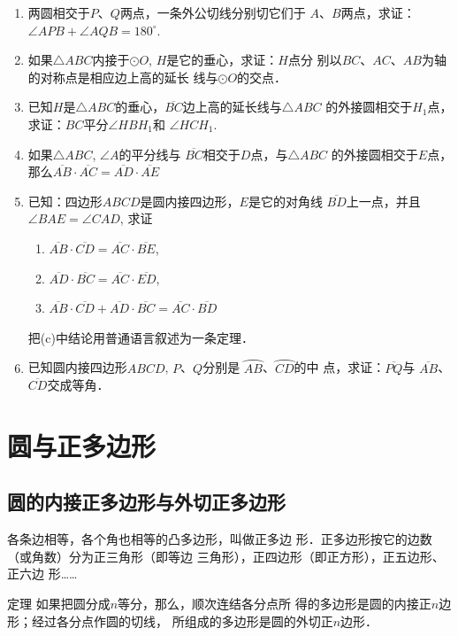 \begin{enumerate}
  \item 两圆相交于$P$、$Q$两点，一条外公切线分别切它们于
  $A$、$B$两点，求证：$\angle APB+\angle AQB=180^{\circ}$.
  \item 如果$\triangle ABC$内接于$\odot O$, $H$是它的垂心，求证：$H$点分
  别以$BC$、$AC$、$AB$为轴的对称点是相应边上高的延长
  线与$\odot O$的交点．
  \item 已知$H$是$\triangle ABC$的垂心，$\overline{BC}$边上高的延长线与$\triangle ABC$
  的外接圆相交于$H_1$点，求证：$BC$平分$\angle HBH_1$和
  $\angle HCH_1$.
  \item 如果$\triangle ABC$, $\angle A$的平分线与
  $\overline{BC}$相交于$D$点，与$\triangle ABC$
  的外接圆相交于$E$点，那么$\overline{AB}\cdot \overline{AC}=\overline{AD}\cdot \overline{AE}$
  \item 已知：四边形$ABCD$是圆内接四边形，$E$是它的对角线
  $\overline{BD}$上一点，并且$\angle BAE=\angle CAD$, 求证
\begin{enumerate}
  \item $\overline{AB}\cdot \overline{CD}=\overline{AC}\cdot \overline{BE}$,
  \item $\overline{AD}\cdot \overline{BC}=\overline{AC}\cdot \overline{ED}$,
  \item $\overline{AB}\cdot \overline{CD}+\overline{AD}\cdot \overline{BC}=\overline{AC}\cdot \overline{BD}$
\end{enumerate}
  把(c)中结论用普通语言叙述为一条定理．

\item 已知圆内接四边形$ABCD$, $P$、$Q$分别是
$\wideparen{AB}$、$\wideparen{CD}$的中
点，求证：$\overline{PQ}$与
$\overline{AB}$、$\overline{CD}$交成等角．
\end{enumerate}


\section{圆与正多边形}
\subsection{圆的内接正多边形与外切正多边形}
各条边相等，各个角也相等的凸多边形，叫做正多边
形．正多边形按它的边数（或角数）分为正三角形（即等边
三角形），正四边形（即正方形），正五边形、正六边
形……

\begin{blk}
  {定理} 如果把圆分成$n$等分，那么，顺次连结各分点所
得的多边形是圆的内接正$n$边形；经过各分点作圆的切线，
所组成的多边形是圆的外切正$n$边形．
\end{blk}

